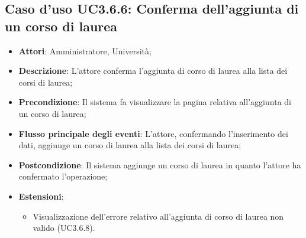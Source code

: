 \subsection{Caso d'uso \texorpdfstring{UC3.6.6}{UC3.6.6}: Conferma dell’aggiunta di un corso di laurea}
\begin{itemize}
	\item \textbf{Attori}: Amministratore, Università;
	\item \textbf{Descrizione}: L'attore conferma l'aggiunta di corso di laurea alla lista dei corsi di laurea;
	
	\item \textbf{Precondizione}: Il sistema fa visualizzare la pagina relativa all'aggiunta di un corso di laurea;
	
	\item \textbf{Flusso principale degli eventi}: L'attore, confermando l'inserimento dei dati, aggiunge un corso di laurea alla lista dei corsi di laurea;
	
	\item \textbf{Postcondizione}: Il sistema aggiunge un corso di laurea in quanto l'attore ha confermato l'operazione;
	
	\item \textbf{Estensioni}:
	\begin{itemize}
		\item Visualizzazione dell'errore relativo all’aggiunta di corso di laurea non valido (UC3.6.8).
	\end{itemize}
\end{itemize}
